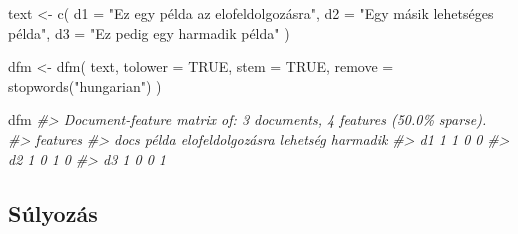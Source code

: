 \documentclass[
]{book}
\newenvironment{Shaded}{\begin{snugshade}}{\end{snugshade}}
\newcommand{\AttributeTok}[1]{\textcolor[rgb]{0.77,0.63,0.00}{#1}}
\newcommand{\CommentTok}[1]{\textcolor[rgb]{0.56,0.35,0.01}{\textit{#1}}}
\newcommand{\ConstantTok}[1]{\textcolor[rgb]{0.00,0.00,0.00}{#1}}
\newcommand{\FunctionTok}[1]{\textcolor[rgb]{0.00,0.00,0.00}{#1}}
\newcommand{\NormalTok}[1]{#1}
\newcommand{\OtherTok}[1]{\textcolor[rgb]{0.56,0.35,0.01}{#1}}
\newcommand{\StringTok}[1]{\textcolor[rgb]{0.31,0.60,0.02}{#1}}
\begin{document}
\begin{Shaded}
\begin{Highlighting}[]

\NormalTok{text }\OtherTok{\textless{}{-}} \FunctionTok{c}\NormalTok{(}
  \AttributeTok{d1 =} \StringTok{"Ez egy példa az elofeldolgozásra"}\NormalTok{,}
  \AttributeTok{d2 =} \StringTok{"Egy másik lehetséges példa"}\NormalTok{,}
  \AttributeTok{d3 =} \StringTok{"Ez pedig egy harmadik példa"}
\NormalTok{)}

\NormalTok{dfm }\OtherTok{\textless{}{-}} \FunctionTok{dfm}\NormalTok{(}
\NormalTok{  text,}
  \AttributeTok{tolower =} \ConstantTok{TRUE}\NormalTok{, }\AttributeTok{stem =} \ConstantTok{TRUE}\NormalTok{,}
  \AttributeTok{remove =} \FunctionTok{stopwords}\NormalTok{(}\StringTok{"hungarian"}\NormalTok{)}
\NormalTok{)}

\NormalTok{dfm}
\CommentTok{\#\textgreater{} Document{-}feature matrix of: 3 documents, 4 features (50.0\% sparse).}
\CommentTok{\#\textgreater{}     features}
\CommentTok{\#\textgreater{} docs példa elofeldolgozásra lehetség harmadik}
\CommentTok{\#\textgreater{}   d1     1                1        0        0}
\CommentTok{\#\textgreater{}   d2     1                0        1        0}
\CommentTok{\#\textgreater{}   d3     1                0        0        1}
\end{Highlighting}
\end{Shaded}

\hypertarget{suxfalyozuxe1s}{%
\subsection{Súlyozás}\label{suxfalyozuxe1s}}
\end{document}

